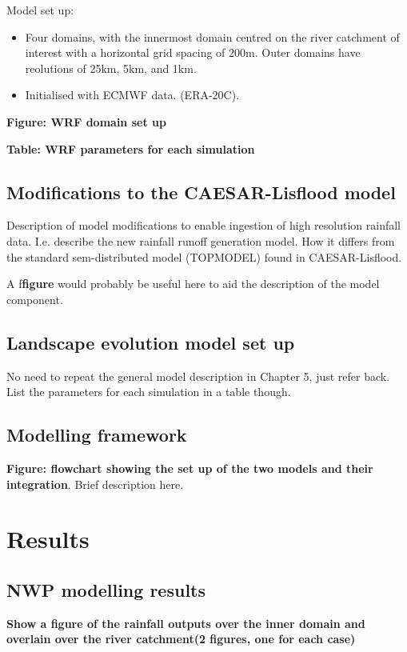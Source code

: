 Model set up:
\begin{itemize}
\item Four domains, with the innermost domain centred on the river catchment of interest with a horizontal grid spacing of 200m. Outer domains have reolutions of 25km, 5km, and 1km.
\item Initialised with ECMWF data. (ERA-20C).
\end{itemize}

\textbf{Figure: WRF domain set up}

\textbf{Table: WRF parameters for each simulation}

\subsection{Modifications to the CAESAR-Lisflood model}
Description of model modifications to enable ingestion of high resolution rainfall data. I.e. describe the new rainfall runoff generation model. How it differs from the standard sem-distributed model (TOPMODEL) found in CAESAR-Lisflood.

A f\textbf{figure} would probably be useful here to aid the description of the model component. 

\subsection{Landscape evolution model set up}

No need to repeat the general model description in Chapter 5, just refer back. List the parameters for each simulation in a table though.

\subsection{Modelling framework}

\textbf{Figure: flowchart showing the set up of the two models and their integration}. Brief description here.

\section{Results}

\subsection{NWP modelling results}

\textbf{Show a figure of the rainfall outputs over the inner domain and overlain over the river catchment(2 figures, one for each case)}

